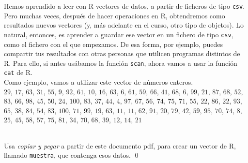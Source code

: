 \documentclass[10pt,a4paper]{article}\usepackage[]{graphicx}\usepackage[]{color}
\newcounter {cont01}
\begin{document}
Hemos aprendido a leer con R vectores de datos, a partir de ficheros de tipo {\tt csv}. Pero muchas veces, después de hacer operaciones en R, obtendremos como resultados nuevos vectores (y, más adelante en el curso, otro tipo de objetos). Lo natural, entonces,  es aprender a guardar ese vector en un fichero de tipo {\tt csv}, como el fichero con el que empezamos. De esa forma, por ejemplo, puedes compartir tus resultados con otras personas que utilicen programas distintos de R.  Para ello, si antes usábamos la función {\tt scan}, ahora vamos a usar la función {\tt cat} de R.\\

Como ejemplo, vamos a utilizar este vector de números enteros.\\

$29$, $ 17$, $ 63$, $ 31$, $ 55$, $ 9$, $ 92$, $ 61$, $ 10$, $ 16$, $ 63$, $ 6$, $ 61$, $ 59$, $ 66$, $ 41$, $ 68$, $ 6$, $ 99$, $ 21$, $ 87$, $ 68$, $ 52$, $ 83$, $ 66$, $ 98$, $ 45$, $ 50$, $ 24$, $ 100$, $ 83$, $ 37$, $ 44$, $ 4$, $ 97$, $ 67$, $ 56$, $ 74$, $ 75$, $ 71$, $ 55$, $ 22$, $ 86$, $ 22$, $ 93$, $ 65$, $ 38$, $ 84$, $ 54$, $ 83$, $ 100$, $ 71$, $ 99$, $ 19$, $ 63$, $ 11$, $ 11$, $ 62$, $ 91$, $ 20$, $ 79$, $ 42$, $ 59$, $ 95$, $ 70$, $ 74$, $ 8$, $ 25$, $ 45$, $ 58$, $ 57$, $ 75$, $ 81$, $ 34$, $ 70$, $ 68$, $ 39$, $ 12$, $ 14$, $ 21$

\begin{ejercicio}
\label{tut02:ejercicio05}
\quad\\
Usa {\em copiar y pegar} a partir de este documento pdf,  para crear un vector de R, llamado {\tt muestra}, que contenga esos datos.
\qed
\end{ejercicio}
\end{document}
